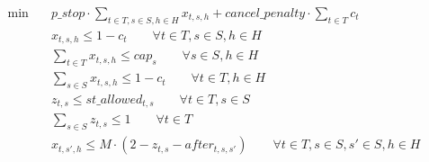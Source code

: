 \begin{align}
  \min\quad & p\_stop \cdot \sum_{t \in T, s \in S, h \in H} x_{t,s,h} + cancel\_penalty \cdot \sum_{t \in T} c_{t} \tag{total\_cost} \\
  & x_{t,s,h} \le 1 - c_{t} \qquad \forall t \in T, s \in S, h \in H \tag{cancel\_disable} \\
  & \sum_{t \in T} x_{t,s,h} \le cap_{s} \qquad \forall s \in S, h \in H \tag{platform\_capacity} \\
  & \sum_{s \in S} x_{t,s,h} \le 1 - c_{t} \qquad \forall t \in T, h \in H \tag{train\_single\_slot} \\
  & z_{t,s} \le st\_allowed_{t,s} \qquad \forall t \in T, s \in S \tag{shortturn\_allowed} \\
  & \sum_{s \in S} z_{t,s} \le 1 \qquad \forall t \in T \tag{shortturn\_single} \\
  & x_{t,s',h} \le M \cdot (2 - z_{t,s} - after_{t,s,s'}) \qquad \forall t \in T, s \in S, s' \in S, h \in H \tag{shortturn\_after} \\
\end{align}